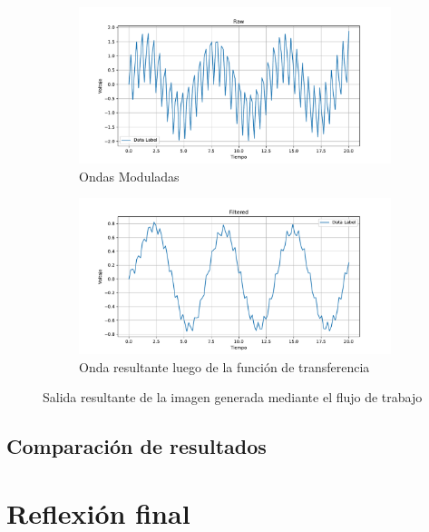 \begin{figure}[htbp]
    \centering
    \begin{subfigure}[b]{0.45\textwidth}
        \centering
        \includegraphics[width=\textwidth]{fig/especifico_2/raw.pdf}
        \caption{Ondas Moduladas}
        \label{fig:onda_modulada_zedboard}
    \end{subfigure}
    \hfill
    \begin{subfigure}[b]{0.45\textwidth}
        \centering
        \includegraphics[width=\textwidth]{fig/especifico_2/Filtered.pdf}
        \caption{Onda resultante luego de la función de transferencia}
        \label{fig:onda_filtrada_zedboard}
    \end{subfigure}
    \caption{Salida resultante de la imagen generada mediante el flujo de trabajo}
    \label{fig:salida_resultante_diagrama_graficos_zedboard}
\end{figure}

\subsection{Comparación de resultados}



\section{Reflexión final}